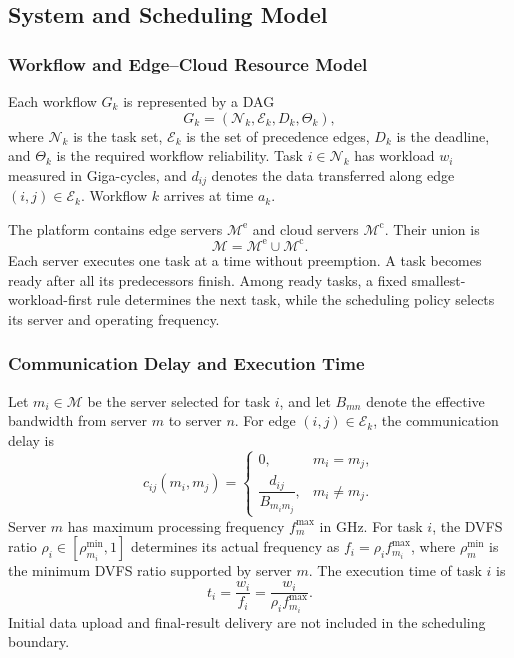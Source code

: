 \documentclass[lettersize,journal]{IEEEtran}
\begin{document}
\subsection{System and Scheduling Model}
\label{sec:system_model}

\subsubsection{Workflow and Edge--Cloud Resource Model}

Each workflow $G_k$ is represented by a DAG
\begin{equation}
    G_k=(\mathcal{N}_k,\mathcal{E}_k,D_k,\Theta_k),
    \label{eq:workflow_model}
\end{equation}
where $\mathcal{N}_k$ is the task set, $\mathcal{E}_k$ is the set of
precedence edges, $D_k$ is the deadline, and $\Theta_k$ is the required
workflow reliability. Task $i\in\mathcal{N}_k$ has workload $w_i$ measured
in Giga-cycles, and
$d_{ij}$ denotes the data transferred along edge
$(i,j)\in\mathcal{E}_k$. Workflow $k$ arrives at time $a_k$.

The platform contains edge servers $\mathcal{M}^{\mathrm{e}}$ and cloud
servers $\mathcal{M}^{\mathrm{c}}$. Their union is
\begin{equation}
    \mathcal{M}=\mathcal{M}^{\mathrm{e}}\cup\mathcal{M}^{\mathrm{c}}.
    \label{eq:server_set}
\end{equation}
Each server executes one task at a time without preemption. A task becomes
ready after all its predecessors finish. Among ready tasks, a fixed
smallest-workload-first rule determines the next task, while the scheduling
policy selects its server and operating frequency.

\subsubsection{Communication Delay and Execution Time}
Let $m_i\in\mathcal{M}$ be the server selected for task $i$, and let $B_{mn}$
denote the effective bandwidth from server $m$ to server $n$. For edge
$(i,j)\in\mathcal{E}_k$, the communication delay is
\begin{equation}
    c_{ij}(m_i,m_j)=
    \begin{cases}
        0, & m_i=m_j,\\[2pt]
        \dfrac{d_{ij}}{B_{m_i m_j}}, & m_i\neq m_j.
    \end{cases}
    \label{eq:communication_time}
\end{equation}
Server $m$ has maximum processing frequency $f_m^{\max}$ in GHz. For task
$i$, the DVFS ratio $\rho_i\in[\rho_{m_i}^{\min},1]$ determines its actual
frequency as $f_i=\rho_i f_{m_i}^{\max}$, where $\rho_m^{\min}$ is the
minimum DVFS ratio supported by server $m$. The execution time of task $i$ is
\begin{equation}
    t_i=\frac{w_i}{f_i}
       =\frac{w_i}{\rho_i f_{m_i}^{\max}}.
    \label{eq:execution_time}
\end{equation}
Initial data upload and final-result delivery are not included in the
scheduling boundary.
\end{document}
